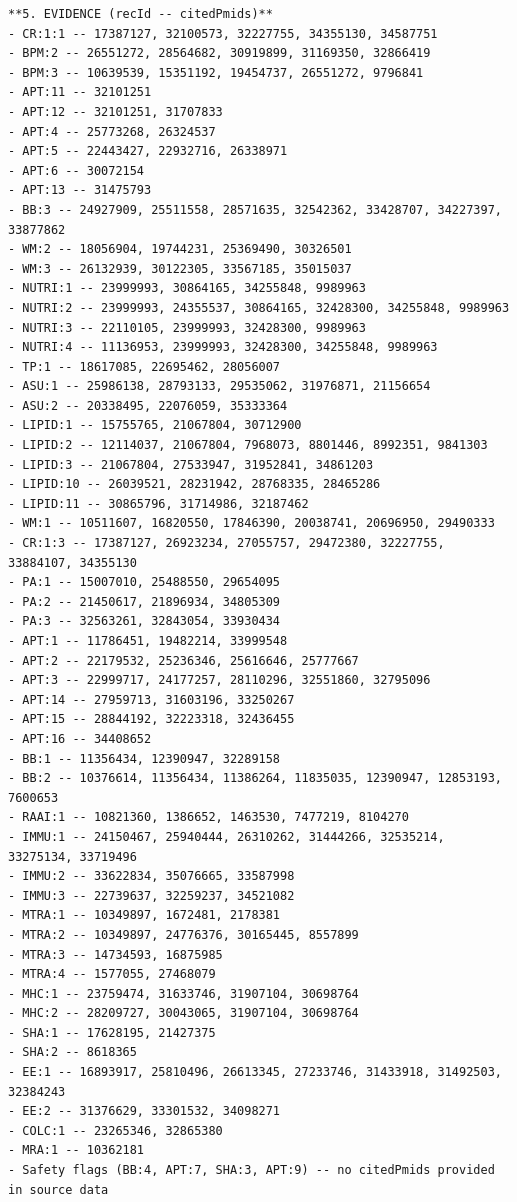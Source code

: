 \begin{lstlisting}
**5. EVIDENCE (recId -- citedPmids)**
- CR:1:1 -- 17387127, 32100573, 32227755, 34355130, 34587751
- BPM:2 -- 26551272, 28564682, 30919899, 31169350, 32866419
- BPM:3 -- 10639539, 15351192, 19454737, 26551272, 9796841
- APT:11 -- 32101251
- APT:12 -- 32101251, 31707833
- APT:4 -- 25773268, 26324537
- APT:5 -- 22443427, 22932716, 26338971
- APT:6 -- 30072154
- APT:13 -- 31475793
- BB:3 -- 24927909, 25511558, 28571635, 32542362, 33428707, 34227397, 33877862
- WM:2 -- 18056904, 19744231, 25369490, 30326501
- WM:3 -- 26132939, 30122305, 33567185, 35015037
- NUTRI:1 -- 23999993, 30864165, 34255848, 9989963
- NUTRI:2 -- 23999993, 24355537, 30864165, 32428300, 34255848, 9989963
- NUTRI:3 -- 22110105, 23999993, 32428300, 9989963
- NUTRI:4 -- 11136953, 23999993, 32428300, 34255848, 9989963
- TP:1 -- 18617085, 22695462, 28056007
- ASU:1 -- 25986138, 28793133, 29535062, 31976871, 21156654
- ASU:2 -- 20338495, 22076059, 35333364
- LIPID:1 -- 15755765, 21067804, 30712900
- LIPID:2 -- 12114037, 21067804, 7968073, 8801446, 8992351, 9841303
- LIPID:3 -- 21067804, 27533947, 31952841, 34861203
- LIPID:10 -- 26039521, 28231942, 28768335, 28465286
- LIPID:11 -- 30865796, 31714986, 32187462
- WM:1 -- 10511607, 16820550, 17846390, 20038741, 20696950, 29490333
- CR:1:3 -- 17387127, 26923234, 27055757, 29472380, 32227755, 33884107, 34355130
- PA:1 -- 15007010, 25488550, 29654095
- PA:2 -- 21450617, 21896934, 34805309
- PA:3 -- 32563261, 32843054, 33930434
- APT:1 -- 11786451, 19482214, 33999548
- APT:2 -- 22179532, 25236346, 25616646, 25777667
- APT:3 -- 22999717, 24177257, 28110296, 32551860, 32795096
- APT:14 -- 27959713, 31603196, 33250267
- APT:15 -- 28844192, 32223318, 32436455
- APT:16 -- 34408652
- BB:1 -- 11356434, 12390947, 32289158
- BB:2 -- 10376614, 11356434, 11386264, 11835035, 12390947, 12853193, 7600653
- RAAI:1 -- 10821360, 1386652, 1463530, 7477219, 8104270
- IMMU:1 -- 24150467, 25940444, 26310262, 31444266, 32535214, 33275134, 33719496
- IMMU:2 -- 33622834, 35076665, 33587998
- IMMU:3 -- 22739637, 32259237, 34521082
- MTRA:1 -- 10349897, 1672481, 2178381
- MTRA:2 -- 10349897, 24776376, 30165445, 8557899
- MTRA:3 -- 14734593, 16875985
- MTRA:4 -- 1577055, 27468079
- MHC:1 -- 23759474, 31633746, 31907104, 30698764
- MHC:2 -- 28209727, 30043065, 31907104, 30698764
- SHA:1 -- 17628195, 21427375
- SHA:2 -- 8618365
- EE:1 -- 16893917, 25810496, 26613345, 27233746, 31433918, 31492503, 32384243
- EE:2 -- 31376629, 33301532, 34098271
- COLC:1 -- 23265346, 32865380
- MRA:1 -- 10362181
- Safety flags (BB:4, APT:7, SHA:3, APT:9) -- no citedPmids provided in source data
\end{lstlisting}
